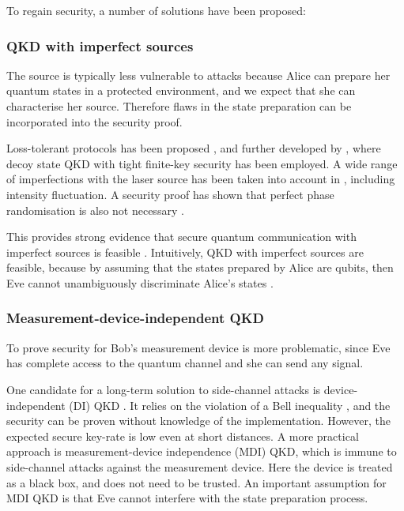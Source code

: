 To regain security, a number of solutions have been proposed:

\subsubsection{QKD with imperfect sources}

The source is typically less vulnerable to attacks because Alice can prepare her quantum states in a protected environment, and we expect that she can characterise her source. Therefore flaws in the state preparation can be incorporated into the security proof.

Loss-tolerant protocols has been proposed \cite{bib:PhysRevA.90.052314}, and further developed by \cite{bib:PhysRevA.92.032305}, where decoy state QKD with tight finite-key security has been employed. A wide range of imperfections with the laser source has been taken into account in \cite{bib:mizutani2015finite}, including intensity fluctuation. A security proof has shown that perfect phase randomisation is also not necessary \cite{bib:cao2015discrete}.

This provides strong evidence that secure quantum communication with imperfect sources is feasible \cite{bib:diamanti2016practical}. Intuitively, QKD with imperfect sources are feasible, because by assuming that the states prepared by Alice are qubits, then Eve cannot unambiguously discriminate Alice's states \cite{bib:diamanti2016practical}. 

\subsubsection{Measurement-device-independent QKD}

To prove security for Bob's measurement device is more problematic, since Eve has complete access to the quantum channel and she can send any signal. 

One candidate for a long-term solution to side-channel attacks is device-independent (DI) QKD \cite{bib:PhysRevLett.98.230501}. It relies on the violation of a Bell inequality \cite{bib:hensen2015loophole}, and the security can be proven without knowledge of the implementation. However, the expected secure key-rate is low even at short distances. A more practical approach is measurement-device independence (MDI) \cite{bib:PhysRevLett.108.130503} QKD, which is immune to side-channel attacks against the measurement device. Here the device is treated as a black box, and does not need to be trusted. An important assumption for MDI QKD is that Eve cannot interfere with the state preparation process. 

